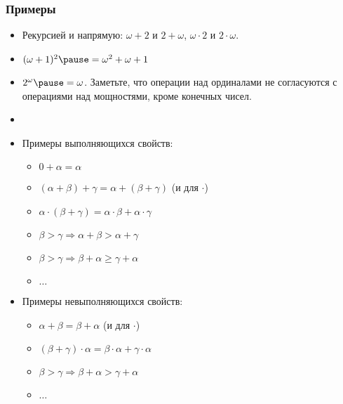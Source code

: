 \documentclass[10pt]{beamer}
\begin{document}
\begin{frame}
    \frametitle{Примеры}
    \begin{itemize}
        \item Рекурсией и напрямую: $\omega + 2$ и $2 + \omega$, $\omega \cdot 2$ и $2 \cdot \omega$.
        \pause
        \item $(\omega+1)^2 \pause = \omega^2 + \omega + 1$
        \pause
        \item $2^\omega \pause = \omega$. Заметьте, что операции над ординалами не согласуются с операциями над мощностями, кроме конечных чисел.
        \pause
        \item[]
        \item Примеры выполняющихся свойств:
        \begin{itemize}
            \item $0 + \alpha = \alpha$
            \item $(\alpha + \beta) + \gamma = \alpha + (\beta + \gamma)$ (и для $\cdot$)
            \item $\alpha \cdot (\beta + \gamma) = \alpha \cdot \beta + \alpha \cdot \gamma$
            \item $\beta > \gamma \Rightarrow \alpha + \beta > \alpha + \gamma$
            \item $\beta > \gamma \Rightarrow \beta + \alpha \geq \gamma + \alpha$
            \item $\ldots$
        \end{itemize}
        \item Примеры невыполняющихся свойств:
        \begin{itemize}
            \item $\alpha + \beta = \beta + \alpha$ (и для $\cdot$)
            \item $(\beta + \gamma) \cdot \alpha = \beta \cdot \alpha + \gamma \cdot \alpha$
            \item $\beta > \gamma \Rightarrow \beta + \alpha > \gamma + \alpha$
            \item $\ldots$            
        \end{itemize}
    \end{itemize}
\end{frame}
\end{document}
